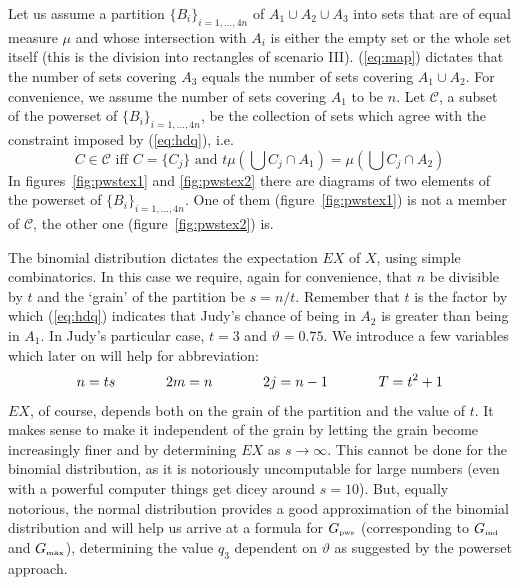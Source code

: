 \documentclass[smallextended]{svjour3}       %
\newcommand{\qnull}[1]{`#1'}
\newcommand{\qvu}[0]{\vartheta}
\begin{document}
Let us assume a partition $\{B_{i}\}_{i=1,{\ldots},4n}$ of
$A_{1}\cup{}A_{2}\cup{}A_{3}$ into sets that are of equal measure
$\mu$ and whose intersection with $A_{i}$ is either the empty set or
the whole set itself (this is the division into rectangles of scenario
III). ({\ref{eq:map}}) dictates that the number of sets covering
$A_{3}$ equals the number of sets covering $A_{1}\cup{}A_{2}$. For
convenience, we assume the number of sets covering $A_{1}$ to be $n$.
Let $\mathcal{C}$, a subset of the powerset of
$\{B_{i}\}_{i=1,{\ldots},4n}$, be the collection of sets which agree
with the constraint imposed by ({\ref{eq:hdq}}), i.e.\
\begin{displaymath}
  C\in\mathcal{C}\mbox{ iff }C=\{C_{j}\}\mbox{ and }t\mu\left(\bigcup{}C_{j}\cap{}A_{1}\right)=\mu\left(\bigcup{}C_{j}\cap{}A_{2}\right)
\end{displaymath}
In figures~\ref{fig:pwstex1} and \ref{fig:pwstex2} there are diagrams
of two elements of the powerset of $\{B_{i}\}_{i=1,{\ldots},4n}$. One
of them (figure~\ref{fig:pwstex1}) is not a member of $\mathcal{C}$,
the other one (figure~\ref{fig:pwstex2}) is.

The binomial distribution dictates the expectation $EX$ of $X$, using
simple combinatorics. In this case we require, again for convenience,
that $n$ be divisible by $t$ and the \qnull{grain} of the partition
be $s=n/t$. Remember that $t$ is the factor by which
({\ref{eq:hdq}}) indicates that Judy's chance of being in $A_{2}$ is
greater than being in $A_{1}$. In Judy's particular case, $t=3$ and
${\qvu}=0.75$. We introduce a few variables which later on will help
for abbreviation:
\begin{displaymath}
n=ts\hspace{.5in}
2m=n\hspace{.5in}
2j=n-1\hspace{.5in}
{T}=t^{2}+1
\end{displaymath}
$EX$, of course, depends both on the grain of the partition and the
value of $t$. It makes sense to make it independent of the grain by
letting the grain become increasingly finer and by determining $EX$ as
$s\rightarrow\infty$. This cannot be done for the binomial
distribution, as it is notoriously uncomputable for large numbers
(even with a powerful computer things get dicey around $s=10$). But,
equally notorious, the normal distribution provides a good
approximation of the binomial distribution and will help us arrive at
a formula for $G_{\mbox{\tiny pws}}$ (corresponding to $G_{\mbox{\tiny
    ind}}$ and $G_{\mbox{\tiny max}}$), determining the value $q_{3}$
dependent on ${\qvu}$ as suggested by the powerset approach.
\end{document}
